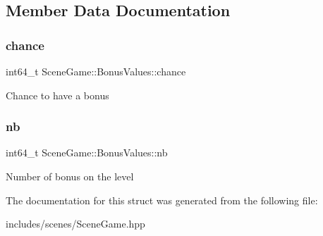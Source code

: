 \subsection{Member Data Documentation}
\mbox{\label{struct_scene_game_1_1_bonus_values_affe45b7f7a76f77c2897f3341839abfe}} 
\subsubsection{\texorpdfstring{chance}{chance}}
{\footnotesize\ttfamily int64\+\_\+t Scene\+Game\+::\+Bonus\+Values\+::chance}

Chance to have a bonus \mbox{\label{struct_scene_game_1_1_bonus_values_a826313028a99bb7df6fef3587628c16c}} 
\subsubsection{\texorpdfstring{nb}{nb}}
{\footnotesize\ttfamily int64\+\_\+t Scene\+Game\+::\+Bonus\+Values\+::nb}

Number of bonus on the level 

The documentation for this struct was generated from the following file\+:\begin{DoxyCompactItemize}
\item 
includes/scenes/Scene\+Game.\+hpp\end{DoxyCompactItemize}
